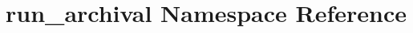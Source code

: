\hypertarget{namespacerun__archival}{\section{run\-\_\-archival Namespace Reference}
\label{namespacerun__archival}
}

